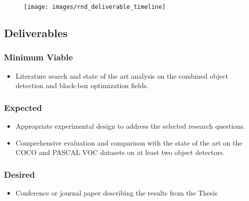 \documentclass[thesis]{mas_proposal}
\begin{document}
\begin{figure}[h!]
    \caption{}
    \texttt{[image: images/rnd\_deliverable\_timeline]}
    \label{}
\end{figure}

\subsection{Deliverables}
\subsubsection*{Minimum Viable}

\begin{itemize}
    \item Literature search and state of the art analysis on the  combined object detection and black-box optimization  fields.

\end{itemize}

\subsubsection*{Expected}
\begin{itemize}
    \item Appropriate experimental design to address the selected research questions.
    \item Comprehensive evaluation and comparison with the state of the art on the COCO and PASCAL VOC datasets on at least two object detectors.
\end{itemize}

\subsubsection*{Desired}
\begin{itemize}
    \item  Conference or journal paper describing the results from the Thesis
\end{itemize}


\nocite{*}

\end{document}
